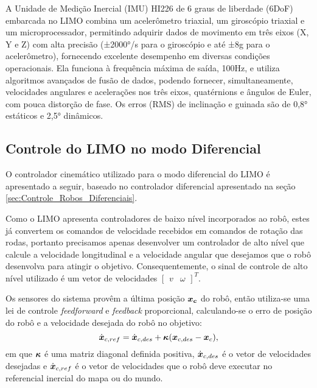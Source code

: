         A Unidade de Medição Inercial (IMU) HI226 de 6 graus de liberdade (6DoF) embarcada no LIMO combina um acelerômetro triaxial, um giroscópio triaxial e um microprocessador, permitindo adquirir dados de movimento em três eixos (X, Y e Z) com alta precisão (±2000°/s para o giroscópio e até ±8g para o acelerômetro), fornecendo excelente desempenho em diversas condições operacionais. Ela funciona à frequência máxima de saída, 100Hz, e utiliza algoritmos avançados de fusão de dados, podendo fornecer, simultaneamente, velocidades angulares e acelerações nos três eixos, quatérnions e ângulos de Euler, com pouca distorção de fase. Os erros (RMS) de inclinação e guinada são de 0,8° estáticos e 2,5° dinâmicos.


    \subsection{Controle do LIMO no modo Diferencial}
    \label{sec:Controle_Dif_LIMO}
    
        O controlador cinemático utilizado para o modo diferencial do LIMO é apresentado a seguir, baseado no controlador diferencial apresentado na seção \ref{sec:Controle_Robos_Diferenciais}.
        
        Como o LIMO apresenta controladores de baixo nível incorporados ao robô, estes já convertem os comandos de velocidade recebidos em comandos de rotação das rodas, portanto precisamos apenas desenvolver um controlador de alto nível que calcule a velocidade longitudinal e a velocidade angular que desejamos que o robô desenvolva para atingir o objetivo. Consequentemente, o sinal de controle de alto nível utilizado é um vetor de velocidades $\begin{bmatrix}v & \omega \end{bmatrix}^{T}$.
        
        Os sensores do sistema provêm a última posição $\boldsymbol{x_c}$ do robô, então utiliza-se uma lei de controle \textit{feedforward} e \textit{feedback} proporcional, calculando-se o erro de posição do robô e a velocidade desejada do robô no objetivo:
        \begin{equation}
            \dot{\boldsymbol{x}}_{c,ref} = \dot{\boldsymbol{x}}_{c,des} + \boldsymbol{\kappa}(\boldsymbol{x}_{c,des} - \boldsymbol{x}_c),
            \label{eq:ff_fb_law_limo}
        \end{equation}
        em que $\boldsymbol{\kappa}$ é uma matriz diagonal definida positiva, $\dot{\boldsymbol{x}}_{c,des}$ é o vetor de velocidades desejadas e $\dot{\boldsymbol{x}}_{c,ref}$ é o vetor de velocidades que o robô deve executar no referencial inercial do mapa ou do mundo.
    
